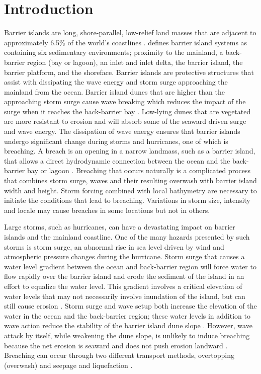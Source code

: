 \documentclass{coastal_paper}
\begin{document}
\section{Introduction}
Barrier islands are long, shore-parallel, low-relief land masses that are adjacent to approximately 6.5\% of the world's coastlines \citep{oertel1985barrier,stutz2001review}. \citet{oertel1985barrier} defines barrier island systems as containing six sedimentary environments; proximity to the mainland, a back-barrier region (bay or lagoon), an inlet and inlet delta, the barrier island, the barrier platform, and the shoreface. Barrier islands are protective structures that assist with dissipating the wave energy and storm surge approaching the mainland from the ocean. Barrier island dunes that are higher than the approaching storm surge cause wave breaking which reduces the impact of the surge when it reaches the back-barrier bay \citep{oertel1985barrier, irish2010potential}. Low-lying dunes that are vegetated are more resistant to erosion and will absorb some of the seaward driven surge and wave energy. The dissipation of wave energy ensures that barrier islands undergo significant change during storms and hurricanes, one of which is breaching. A breach is an opening in a narrow landmass, such as a barrier island, that allows a direct hydrodynamic connection between the ocean and the back-barrier bay or lagoon \citep{kraus2003analytical, wamsley2005coastal}. Breaching that occurs naturally is a complicated process that combines storm surge, waves and their resulting overwash with barrier island width and height. Storm forcing combined with local bathymetry are necessary to initiate the conditions that lead to breaching. Variations in storm size, intensity and locale may cause breaches in some locations but not in others. 

Large storms, such as hurricanes, can have a devastating impact on barrier islands and the mainland coastline. One of the many hazards presented by such storms is storm surge, an abnormal rise in sea level driven by wind and atmospheric pressure changes during the hurricane. Storm surge that causes a water level gradient between the ocean and back-barrier region will force water to flow rapidly over the barrier island and erode the sediment of the island in an effort to equalize the water level. This gradient involves a critical elevation of water levels that may not necessarily involve inundation of the island, but can still cause erosion \citep{kraus2002barrier, kraus2003analytical}. Storm surge and wave setup both increase the elevation of the water in the ocean and the back-barrier region; these water levels in addition to wave action reduce the stability of the barrier island dune slope \citep{kraus2003analytical, kraus2002barrier}. However, wave attack by itself, while weakening the dune slope, is unlikely to induce breaching because the net erosion is seaward and does not push erosion landward \citep{pierce1970tidal}. Breaching can occur through two different transport methods, overtopping (overwash) and seepage and liquefaction \citep{kraus2002barrier, kraus2003analytical}.
\end{document}
